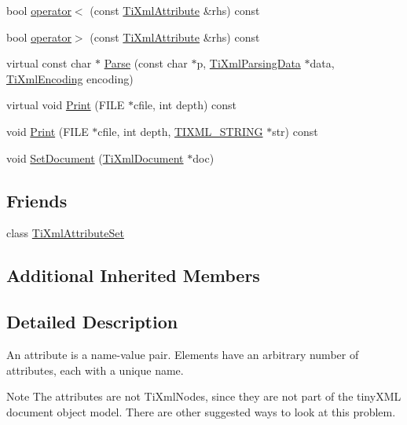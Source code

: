 \begin{DoxyCompactItemize}
bool \hyperlink{class_ti_xml_attribute_adb8b6f2cad5948e73e383182e7ce10de}{operator$<$} (const \hyperlink{class_ti_xml_attribute}{Ti\-Xml\-Attribute} \&rhs) const 
\item 
bool \hyperlink{class_ti_xml_attribute_a867562769ef9778c1690cd373246b05b}{operator$>$} (const \hyperlink{class_ti_xml_attribute}{Ti\-Xml\-Attribute} \&rhs) const 
\item 
virtual const char $\ast$ \hyperlink{class_ti_xml_attribute_ad62774421b814894b995af3b5d231dda}{Parse} (const char $\ast$p, \hyperlink{class_ti_xml_parsing_data}{Ti\-Xml\-Parsing\-Data} $\ast$data, \hyperlink{tinyxml_8h_a88d51847a13ee0f4b4d320d03d2c4d96}{Ti\-Xml\-Encoding} encoding)
\item 
virtual void \hyperlink{class_ti_xml_attribute_acc04956c1d5c4c31fe74f7a7528d109a}{Print} (F\-I\-L\-E $\ast$cfile, int depth) const 
\item 
void \hyperlink{class_ti_xml_attribute_a19e6b6862a80b188571c47947e88d030}{Print} (F\-I\-L\-E $\ast$cfile, int depth, \hyperlink{tinyxml_8h_a92bada05fd84d9a0c9a5bbe53de26887}{T\-I\-X\-M\-L\-\_\-\-S\-T\-R\-I\-N\-G} $\ast$str) const 
\item 
void \hyperlink{class_ti_xml_attribute_ac12a94d4548302afb12f488ba101f7d1}{Set\-Document} (\hyperlink{class_ti_xml_document}{Ti\-Xml\-Document} $\ast$doc)
\end{DoxyCompactItemize}
\subsection*{Friends}
\begin{DoxyCompactItemize}
\item 
class \hyperlink{class_ti_xml_attribute_a35a7b7f89f708527677d5078d41ce0bf}{Ti\-Xml\-Attribute\-Set}
\end{DoxyCompactItemize}
\subsection*{Additional Inherited Members}


\subsection{Detailed Description}
An attribute is a name-\/value pair. Elements have an arbitrary number of attributes, each with a unique name.

\begin{DoxyNote}{Note}
The attributes are not Ti\-Xml\-Nodes, since they are not part of the tiny\-X\-M\-L document object model. There are other suggested ways to look at this problem. 
\end{DoxyNote}


